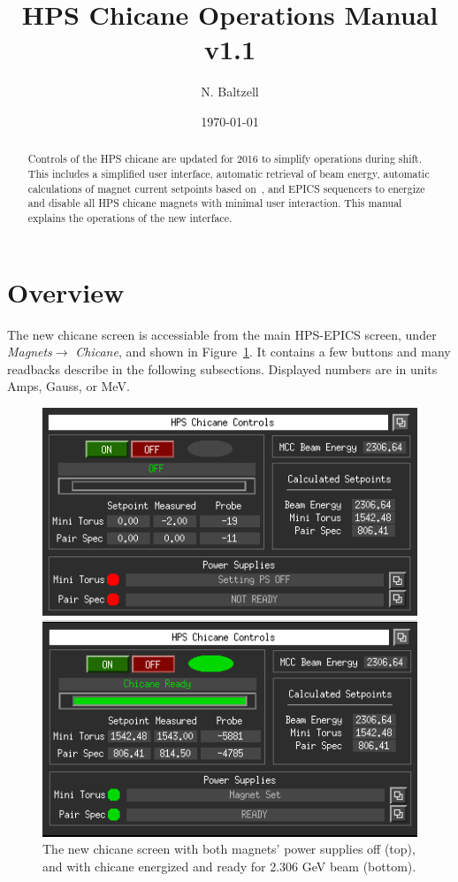\documentclass[amsmath,amssymb,notitlepage,12pt]{revtex4-1}
\begin{document}
\title{HPS Chicane Operations Manual v1.1}
\author{N. Baltzell}
\date{\today}
\begin{abstract}
    Controls of the HPS chicane are updated for 2016 to simplify operations during shift.  This includes a simplified user interface, automatic retrieval of beam energy, automatic calculations of magnet current setpoints based on~\cite{chicaneSettings}, and EPICS sequencers to energize and disable all HPS chicane magnets with minimal user interaction.  This manual explains the operations of the new interface. 
\end{abstract}

\maketitle
\tableofcontents
\newpage

\section{Overview}
The new chicane screen is accessiable from the main HPS-EPICS screen, under {\em Magnets}$ \to$ {\em Chicane}, and shown in Figure~\ref{fig:guiChicaneOff}.  It contains a few buttons and many readbacks describe in the following subsections.  Displayed numbers are in units Amps, Gauss, or MeV. 
\begin{figure}[htbp]
    \centering\includegraphics[width=12cm]{pics/guiOFF}
    
    \centering\includegraphics[width=12cm]{pics/guiON}
    \caption{The new chicane screen with both magnets' power supplies off (top), and with chicane energized and ready for 2.306 GeV beam (bottom).\label{fig:guiChicaneOff}}
\end{figure}
\end{document}
